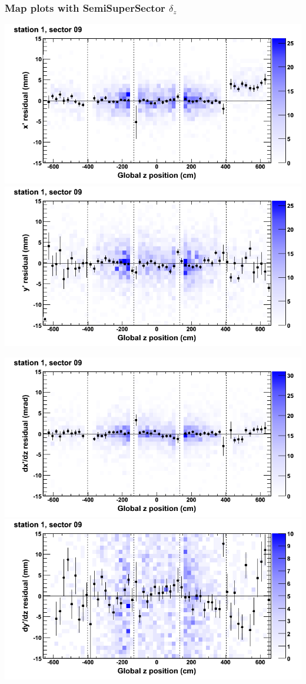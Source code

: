 \documentclass[compress]{beamer}
\begin{document}
\begin{frame}
\frametitle{Map plots with SemiSuperSector $\delta_z$}
\includegraphics[width=0.5\linewidth]{zfit_mapplots/DTvsz_st1sec09_x.png}
\includegraphics[width=0.5\linewidth]{zfit_mapplots/DTvsz_st1sec09_y.png}

\includegraphics[width=0.5\linewidth]{zfit_mapplots/DTvsz_st1sec09_dxdz.png}
\includegraphics[width=0.5\linewidth]{zfit_mapplots/DTvsz_st1sec09_dydz.png}
\end{frame}
\end{document}
